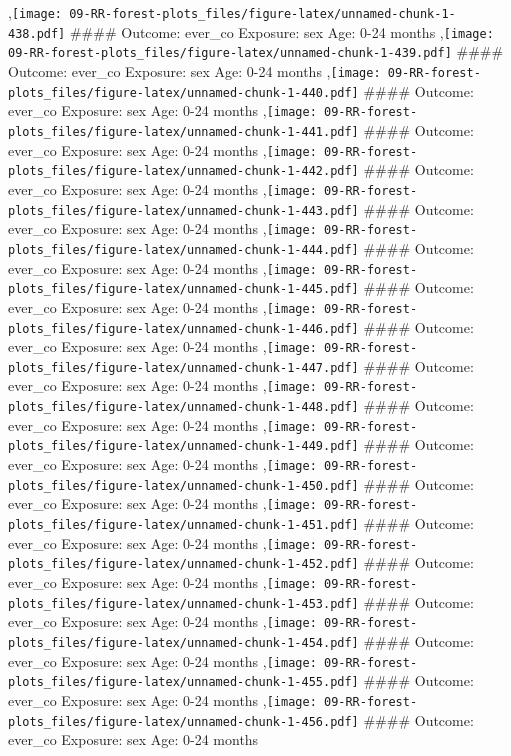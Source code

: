 \documentclass[
  9pt,
]{book}
\begin{document}
,\texttt{[image: 09-RR-forest-plots\_files/figure-latex/unnamed-chunk-1-438.pdf]}
\#\#\#\# Outcome: ever\_co Exposure: sex Age: 0-24 months
,\texttt{[image: 09-RR-forest-plots\_files/figure-latex/unnamed-chunk-1-439.pdf]}
\#\#\#\# Outcome: ever\_co Exposure: sex Age: 0-24 months
,\texttt{[image: 09-RR-forest-plots\_files/figure-latex/unnamed-chunk-1-440.pdf]}
\#\#\#\# Outcome: ever\_co Exposure: sex Age: 0-24 months
,\texttt{[image: 09-RR-forest-plots\_files/figure-latex/unnamed-chunk-1-441.pdf]}
\#\#\#\# Outcome: ever\_co Exposure: sex Age: 0-24 months
,\texttt{[image: 09-RR-forest-plots\_files/figure-latex/unnamed-chunk-1-442.pdf]}
\#\#\#\# Outcome: ever\_co Exposure: sex Age: 0-24 months
,\texttt{[image: 09-RR-forest-plots\_files/figure-latex/unnamed-chunk-1-443.pdf]}
\#\#\#\# Outcome: ever\_co Exposure: sex Age: 0-24 months
,\texttt{[image: 09-RR-forest-plots\_files/figure-latex/unnamed-chunk-1-444.pdf]}
\#\#\#\# Outcome: ever\_co Exposure: sex Age: 0-24 months
,\texttt{[image: 09-RR-forest-plots\_files/figure-latex/unnamed-chunk-1-445.pdf]}
\#\#\#\# Outcome: ever\_co Exposure: sex Age: 0-24 months
,\texttt{[image: 09-RR-forest-plots\_files/figure-latex/unnamed-chunk-1-446.pdf]}
\#\#\#\# Outcome: ever\_co Exposure: sex Age: 0-24 months
,\texttt{[image: 09-RR-forest-plots\_files/figure-latex/unnamed-chunk-1-447.pdf]}
\#\#\#\# Outcome: ever\_co Exposure: sex Age: 0-24 months
,\texttt{[image: 09-RR-forest-plots\_files/figure-latex/unnamed-chunk-1-448.pdf]}
\#\#\#\# Outcome: ever\_co Exposure: sex Age: 0-24 months
,\texttt{[image: 09-RR-forest-plots\_files/figure-latex/unnamed-chunk-1-449.pdf]}
\#\#\#\# Outcome: ever\_co Exposure: sex Age: 0-24 months
,\texttt{[image: 09-RR-forest-plots\_files/figure-latex/unnamed-chunk-1-450.pdf]}
\#\#\#\# Outcome: ever\_co Exposure: sex Age: 0-24 months
,\texttt{[image: 09-RR-forest-plots\_files/figure-latex/unnamed-chunk-1-451.pdf]}
\#\#\#\# Outcome: ever\_co Exposure: sex Age: 0-24 months
,\texttt{[image: 09-RR-forest-plots\_files/figure-latex/unnamed-chunk-1-452.pdf]}
\#\#\#\# Outcome: ever\_co Exposure: sex Age: 0-24 months
,\texttt{[image: 09-RR-forest-plots\_files/figure-latex/unnamed-chunk-1-453.pdf]}
\#\#\#\# Outcome: ever\_co Exposure: sex Age: 0-24 months
,\texttt{[image: 09-RR-forest-plots\_files/figure-latex/unnamed-chunk-1-454.pdf]}
\#\#\#\# Outcome: ever\_co Exposure: sex Age: 0-24 months
,\texttt{[image: 09-RR-forest-plots\_files/figure-latex/unnamed-chunk-1-455.pdf]}
\#\#\#\# Outcome: ever\_co Exposure: sex Age: 0-24 months
,\texttt{[image: 09-RR-forest-plots\_files/figure-latex/unnamed-chunk-1-456.pdf]}
\#\#\#\# Outcome: ever\_co Exposure: sex Age: 0-24 months
\end{document}
